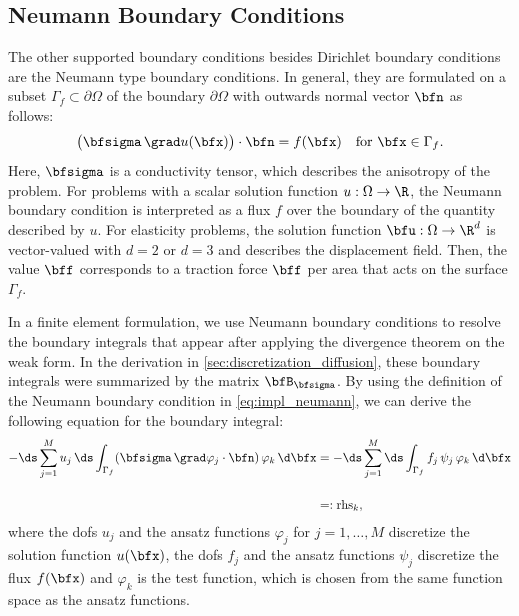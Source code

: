 

\subsection{Neumann Boundary Conditions}

The other supported boundary conditions besides Dirichlet boundary conditions are the Neumann type boundary conditions.
In general, they are formulated on a subset $\Gamma_f \subset ∂\Omega$ of the boundary $∂\Omega$ with outwards normal vector $\bfn$ as follows:
%
\begin{align}\label{eq:impl_neumann}
  \big(\bfsigma\,\grad u(\bfx)\big) \cdot \bfn = f(\bfx) \quad \text{for }\bfx \in \Gamma_f.
\end{align}
Here, $\bfsigma$ is a conductivity tensor, which describes the anisotropy of the problem. For problems with a scalar solution function $u: \Omega \to \R$, the Neumann boundary condition is interpreted as a flux $f$ over the boundary of the quantity described by $u$. For elasticity problems, the solution function $\bfu: \Omega \to \R^d$ is vector-valued with $d=2$ or $d=3$ and describes the displacement field. Then, the value $\bff$ corresponds to a traction force $\bff$ per area that acts on the surface $\Gamma_f$.

In a finite element formulation, we use Neumann boundary conditions to resolve the boundary integrals that appear after applying the divergence theorem on the weak form. In the derivation in \cref{sec:discretization_diffusion}, these boundary integrals were summarized by the matrix $\bfB_{\bfsigma}$.
By using the definition of the Neumann boundary condition in \cref{eq:impl_neumann}, we can derive the following equation for the boundary integral:
%
\begin{subequations}
\begin{align}
  -\ds\sum\limits_{j=1}^{M} u_j\, \ds\int_{\Gamma_f} ( \bfsigma\,\grad \varphi_j \cdot \bfn)\, \varphi_k\,\d\bfx 
  &= -\ds\sum\limits_{j=1}^{M} \ds\int_{\Gamma_f} f_j\,\psi_j\,\varphi_k \,\d\bfx \label{eq:impl_neumann_a} \\[4mm] 
    &=: \text{rhs}_k, \label{eq:impl_neumann_b}
\end{align}
\end{subequations}
where the dofs $u_j$ and the ansatz functions $\varphi_j$ for $j=1,\dots,M$ discretize the solution function $u(\bfx)$, the dofs $f_j$ and the ansatz functions $\psi_j$ discretize the flux $f(\bfx)$ and $\varphi_k$ is the test function, which is chosen from the same function space as the ansatz functions.

